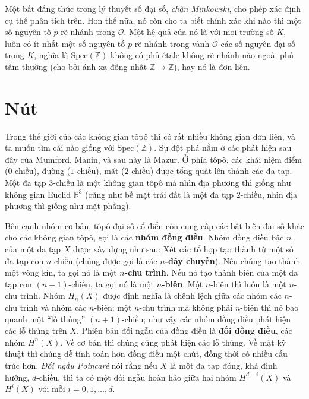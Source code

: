 \documentclass[12pt]{article}
\begin{document}
Một bất đẳng thức trong lý thuyết số đại số, {\it chặn Minkowski}, cho phép xác định cụ thể phân tích trên. Hơn thế nữa, nó còn cho ta biết chính xác khi nào thì một số nguyên tố $p$ rẽ nhánh trong $\mathcal{O}$. Một hệ quả của nó là với mọi trường số $K$, luôn có ít nhất một số nguyên tố $p$ rẽ nhánh trong vành $\mathcal{O}$ các số nguyên đại số trong $K$, nghĩa là $\text{Spec}(\mathbb{Z})$ không có phủ  étale không rẽ nhánh nào ngoài phủ tầm thường (cho bởi ánh xạ đồng nhất $\mathbb{Z} \to \mathbb{Z}$), hay nó là đơn liên.





\section{Nút}

Trong thế giới của các không gian tôpô thì có rất nhiều không gian đơn liên, và ta muốn tìm cái nào giống với $\text{Spec}(\mathbb{Z})$. Sự đột phá nằm ở các phát hiện sau đây của Mumford, Manin, và sau này là Mazur. Ở phía tôpô, các khái niệm điểm ($0$-chiều), đường ($1$-chiều), mặt ($2$-chiều) được tổng quát lên thành các đa tạp. Một đa tạp $3$-chiều là một không gian tôpô mà nhìn địa phương thì giống như không gian Euclid $\mathbb{R}^3$ (cũng như bề mặt trái đất là một đa tạp $2$-chiều, nhìn địa phương thì giống như mặt phẳng).

Bên cạnh nhóm cơ bản, tôpô đại số cổ điển còn cung cấp các bất biến đại số khác cho các không gian tôpô, gọi là các {\bf nhóm đồng điều}. Nhóm đồng điều bậc $n$ của một đa tạp $X$ được xây dựng như sau: Xét các tổ hợp tạo thành từ một số đa tạp con $n$-chiều (chúng được gọi là các {\bf $n$-dây chuyền}). Nếu chúng tạo thành một vòng kín, ta gọi nó là một {\bf $n$-chu trình}. Nếu nó tạo thành biên của một đa tạp con $(n+1)$-chiều, ta gọi nó là một {\bf $n$-biên}. Một $n$-biên thì luôn là một $n$-chu trình. Nhóm $H_n(X)$ được định nghĩa là chênh lệch giữa các nhóm các $n$-chu trình và nhóm các $n$-biên: một $n$-chu trình mà không phải $n$-biên thì nó bao quanh một ``lỗ thủng'' $(n+1)$-chiều; như vậy các nhóm đồng điều phát hiện các lỗ thủng trên $X$. Phiên bản đối ngẫu của đồng điều là {\bf đối đồng điều}, các nhóm $H^n(X)$. Về cơ bản thì chúng cũng phát hiện các lỗ thủng. Về mặt kỹ thuật thì chúng dễ tính toán hơn đồng điều một chút, đồng thời có nhiều cấu trúc hơn. {\it Đối ngẫu Poincaré} nói rằng nếu $X$ là một đa tạp đóng, khả định hướng, $d$-chiều, thì ta có một đối ngẫu hoàn hảo giữa hai nhóm $H^{d-i}(X)$ và $H^i(X)$ với mỗi $i = 0,1,\ldots,d$.
\end{document}

